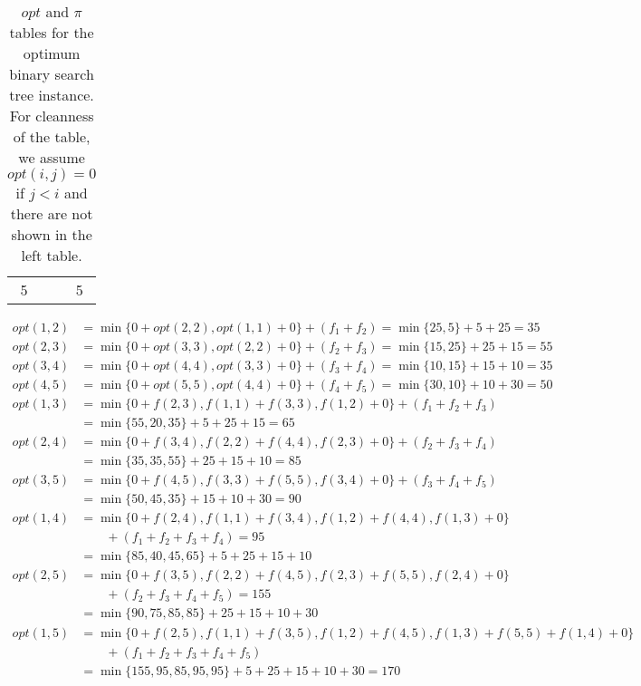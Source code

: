 \begin{example}
\begin{table}[H]
\begin{tabular}{|c|c|c|c|c|c|}
								5& \multicolumn{4}{c|}{} & 5 \\\cline{1-1}\cline{6-6}
							\end{tabular}
							\caption{$opt$ and $\pi$ tables for the optimum binary search tree instance. For cleanness of the table, we assume $opt(i, j) = 0$ if $j < i$ and there are not shown in the left table.}
						\end{table}
						\vspace*{-30pt}
						\begin{align*}
							opt(1, 2) &= \min\{0 + opt(2, 2), opt(1, 1) + 0\} + (f_1 + f_2) = \min\{25, 5\} + 5 + 25 = 35\\
							opt(2, 3) &= \min\{0 + opt(3, 3), opt(2, 2) + 0\} + (f_2 + f_3) = \min\{15, 25\} + 25 + 15 = 55\\
							opt(3, 4) &= \min\{0 + opt(4, 4), opt(3, 3) + 0\} + (f_3 + f_4) = \min\{10, 15\} + 15 + 10 = 35\\
							opt(4, 5) &= \min\{0 + opt(5, 5), opt(4, 4) + 0\} + (f_4 + f_5) = \min\{30, 10\} + 10 + 30 = 50\\
							opt(1, 3) &= \min\{0 + f(2, 3), f(1, 1) + f(3, 3), f(1, 2) + 0\} + (f_1 + f_2 + f_3) \\
							&= \min\{55, 20, 35\} + 5 + 25 + 15 = 65 \\
						    opt(2, 4) &= \min\{0 + f(3, 4), f(2, 2) + f(4, 4), f(2, 3) + 0\} + (f_2 + f_3 + f_4) \\ 
						    &= \min\{35, 35, 55\} + 25 + 15 + 10 = 85 \\
							opt(3, 5) &= \min\{0 + f(4, 5), f(3, 3) + f(5, 5), f(3, 4) + 0\} + (f_3 + f_4 + f_5) \\
							&= \min\{50, 45, 35\} + 15 + 10 + 30 = 90 \\
							opt(1, 4) &= \min\{0 + f(2, 4), f(1, 1) + f(3, 4), f(1, 2) + f(4, 4), f(1, 3) + 0\} \\ & \qquad + (f_1 + f_2 + f_3 + f_4) = 95\\
							&= \min\{85, 40, 45, 65\} + 5 + 25 + 15 + 10\\
							opt(2, 5) &= \min\{0 + f(3, 5), f(2, 2) + f(4, 5), f(2, 3) + f(5, 5), f(2, 4) + 0\} \\ & \qquad + (f_2 + f_3 + f_4 + f_5) = 155\\
							&= \min\{90, 75, 85, 85\} + 25 + 15 + 10 + 30 \\
							opt(1, 5) &= \min\{0 + f(2, 5), f(1, 1) + f(3, 5), f(1, 2) + f(4, 5), f(1, 3) + f(5, 5) + f(1, 4) + 0\} \\ & \qquad + (f_1 + f_2 + f_3 + f_4 + f_5) \\
							&= \min\{155, 95, 85, 95, 95\} + 5 + 25 + 15 + 10 + 30 = 170
						\end{align*}
					\end{example}

